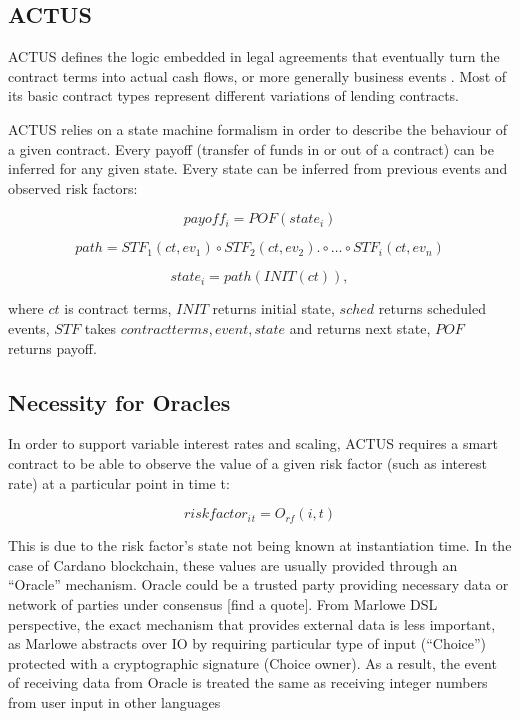 \documentclass[runningheads]{llncs}
\begin{document}
\subsection{ACTUS}

ACTUS defines the logic embedded in legal agreements that eventually
turn the contract terms into actual cash flows, or more generally
business events \cite{actus}. Most of its basic contract types represent
different variations of lending contracts.

ACTUS relies on a state machine formalism in order to describe the
behaviour of a given contract. Every payoff (transfer of funds in
or out of a contract) can be inferred for any given state. Every state
can be inferred from previous events and observed risk factors:

\noindent 
\begin{equation}
payoff_{i}=POF(state_{i})
\end{equation}

\noindent 
\begin{equation}
path=STF_{1}(ct,ev_{1})\circ STF_{2}(ct,ev_{2}).\circ\ldots\circ STF_{i}(ct,ev_{n})
\end{equation}

\noindent 
\begin{equation}
state_{i}=path(INIT(ct)),
\end{equation}

where $ct$ is contract terms, $INIT$ returns initial state, $sched$
returns scheduled events, $STF$ takes ${contractterms,event,state}$
and returns next state, $POF$ returns payoff.

\subsection{Necessity for Oracles}

In order to support variable interest rates and scaling, ACTUS requires
a smart contract to be able to observe the value of a given risk factor
(such as interest rate) at a particular point in time t:

\noindent 
\begin{equation}
riskfactor_{i}{}_{t}=O_{rf}(i,t)
\end{equation}

This is due to the risk factor's state not being known at instantiation
time. In the case of Cardano blockchain, these values are usually
provided through an ``Oracle'' mechanism\cite{oracles}. Oracle
could be a trusted party providing necessary data or network of parties
under consensus {[}find a quote{]}. From Marlowe DSL perspective,
the exact mechanism that provides external data is less important,
as Marlowe abstracts over IO by requiring particular type of input
(``Choice'') protected with a cryptographic signature (Choice owner).
As a result, the event of receiving data from Oracle is treated the
same as receiving integer numbers from user input in other languages
\end{document}
